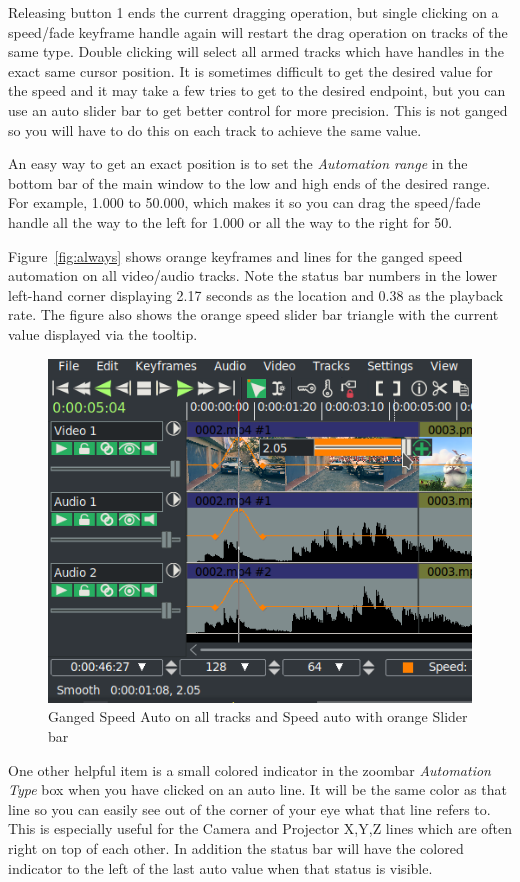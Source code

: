Releasing button 1 ends the current dragging operation, but single clicking on a speed/fade keyframe handle again will restart the drag operation on tracks of the same type.  Double clicking will select all armed tracks which have handles in the exact same cursor position.  It is sometimes difficult to get the desired value for the speed and it may take a few tries to get to the desired endpoint, but you can use an auto slider bar to get better control for more precision.  This is not ganged so you will have to do this on each track to achieve the same value.

An easy way to get an exact position is to set the \textit{Automation range} in the bottom bar of the main
window to the low and high ends of the desired range. For example, 1.000 to 50.000, which makes it
so you can drag the speed/fade handle all the way to the left for 1.000 or all the way to the right for 50.

Figure~\ref{fig:always} shows orange keyframes and lines for the ganged speed automation on all video/audio tracks.
Note the status bar numbers in the lower left-hand corner displaying 2.17 seconds as the location and 0.38 as the playback rate. The figure also shows the orange speed slider bar triangle with the current value displayed via the tooltip.

\begin{figure}[htpb]
    \centering
    \includegraphics[width=0.8\linewidth]{images/speed.png}
    \caption{Ganged Speed Auto on all tracks and Speed auto with orange Slider bar}
    \label{fig:speed}
\end{figure}

One other helpful item is a small colored indicator in the zoombar \textit{Automation Type} box when you have clicked on an auto line.  It will be the same color as that line so you can easily see out of the corner of your eye what that line refers to.  This is especially useful for the Camera and Projector X,Y,Z lines which are often right on top of each other.  In addition the status bar will have the colored indicator to the left of the last auto value when that status is visible.

